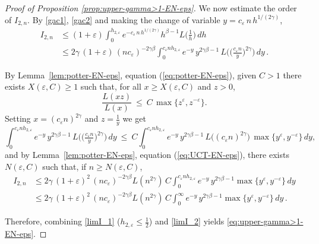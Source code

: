 \documentclass[preprint]{imsart}
\newcommand{\1}{\mathbf{1}}
\theoremstyle{plain}
\theoremstyle{definition}
\begin{document}
\begin{proof}[Proof of Proposition \ref{prop:upper-gamma>1-EN-eps}]
We now estimate the order of \(I_{2,n}\). By \eqref{gac1}, \eqref{gac2} and making the change of variable \(y=c_{\varepsilon}\,n\,h^{1/(2\gamma)}\),
\begin{equation}
    \begin{split}
        I_{2,n} &\le (1+\varepsilon) \int_{0}^{h_{2,\varepsilon}} e^{-c_{\varepsilon}\,n \,h^{1/(2\gamma)}}h^{\beta-1}L\!\Big(\tfrac{1}{h}\Big)\,dh\\
        &\le 2\gamma\,(1+\varepsilon) \,(n c_{\varepsilon})^{-2\gamma\beta}\int_{0}^{c_{\varepsilon}n h_{2,\varepsilon}}e^{-y}\,y^{2\gamma\beta-1}\,
        L\!\Big(\big(\tfrac{c_{\varepsilon}n}{y}\big)^{2\gamma}\Big)\,dy\,.
    \end{split}
\end{equation}

By Lemma~\ref{lem:potter-EN-eps}, equation (\ref{eq:potter-EN-eps}), given \(C>1\) there exists \(X(\varepsilon,C)\ge 1\) such that, for all \(x\ge X(\varepsilon,C)\) and \(z>0\),
\[
\frac{L(xz)}{L(x)}\ \le\ C\,\max\{z^\varepsilon,z^{-\varepsilon}\}.
\]
Setting \(x=(c_{\varepsilon}n)^{2\gamma}\) and \(z=\tfrac{1}{y}\) we get
\[
\int_{0}^{c_{\varepsilon}n h_{2,\varepsilon}}e^{-y}\,y^{2\gamma\beta-1}\,
L\!\Big(\big(\tfrac{c_{\varepsilon}n}{y}\big)^{2\gamma}\Big)\,dy
\ \le\ 
C\int_{0}^{c_{\varepsilon}n h_{2,\varepsilon}}e^{-y}\,y^{2\gamma\beta-1}\,
L\big((c_{\varepsilon}n)^{2\gamma}\big)\,\max\{y^{\varepsilon},y^{-\varepsilon}\}\,dy,
\]
and by Lemma~\ref{lem:potter-EN-eps}, equation (\ref{eq:UCT-EN-eps}), there exists \(N(\varepsilon,C)\) such that, if \(n\ge N(\varepsilon,C)\),
\begin{equation}\label{limI_2}
\begin{split}
    I_{2,n}&\le 2\gamma\,(1+\varepsilon)^{2} \,(n c_{\varepsilon})^{-2\gamma\beta}L(n^{2\gamma})\,C
    \int_{0}^{c_{\varepsilon}n h_{2,\varepsilon}}e^{-y}\,y^{2\gamma\beta-1}\max\{y^{\varepsilon},y^{-\varepsilon}\}\,dy\\
    &\le 2\gamma\,(1+\varepsilon)^{2} \,(n c_{\varepsilon})^{-2\gamma\beta}L(n^{2\gamma})\,C
    \int_{0}^{\infty}e^{-y}\,y^{2\gamma\beta-1}\max\{y^{\varepsilon},y^{-\varepsilon}\}\,dy\,.
\end{split}
\end{equation}

Therefore, combining \eqref{limI_1} (\(h_{2,\varepsilon} \le \frac{1}{2}\)) and \eqref{limI_2} yields \eqref{eq:upper-gamma>1-EN-eps}.


\end{proof}
\end{document}
